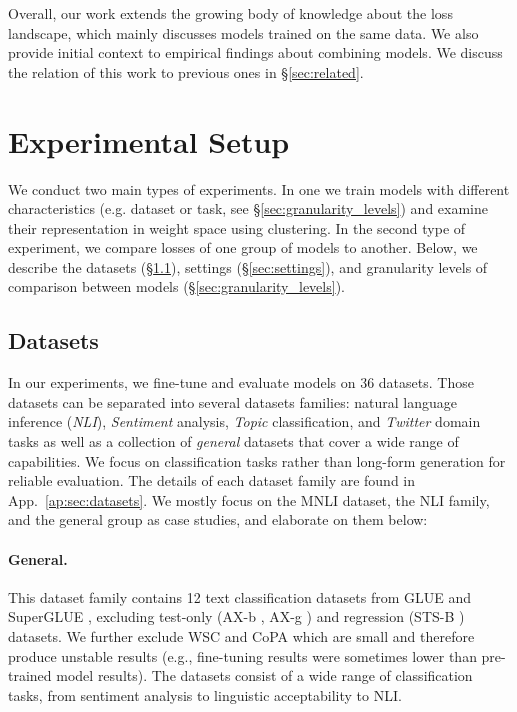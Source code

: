 \documentclass[nohyperref]{article}
\theoremstyle{plain}
\theoremstyle{definition}
\theoremstyle{remark}
\begin{document}
Overall, our work extends the growing body of knowledge about the loss landscape, which mainly discusses models trained on the same data.
We also provide initial context to empirical findings about combining models.
We discuss the relation of this work to previous ones in \S\ref{sec:related}.


\section{Experimental Setup}
We conduct two main types of experiments. In one we train models with different characteristics (e.g. dataset or task, see \S\ref{sec:granularity_levels}) and examine their representation in weight space using clustering. In the second type of experiment, we compare losses of one group of models to another.
Below, we describe the datasets (\S\ref{sec:datasets}), settings (\S\ref{sec:settings}), and granularity levels of comparison between models (\S\ref{sec:granularity_levels}).


\subsection{Datasets}\label{sec:datasets}
In our experiments, we fine-tune and evaluate models on 36 datasets. Those datasets can be separated into several datasets families: natural language inference (\emph{NLI}), \emph{Sentiment} analysis, \emph{Topic} classification, and \emph{Twitter} domain tasks as well as a collection of \emph{general} datasets that cover a wide range of capabilities. We focus on classification tasks rather than long-form generation for reliable evaluation. The details of each dataset family are found in App.~\ref{ap:sec:datasets}. We mostly focus on the MNLI \citep{williams2018broad} dataset, the NLI family, and the general group as case studies, and elaborate on them below:

\paragraph{General.} This dataset family contains 12 text classification datasets from GLUE \citep{wang-etal-2018-glue} and SuperGLUE \citep{Wang2019SuperGLUEAS}, excluding test-only (AX-b \citep{Wang2019SuperGLUEAS}, AX-g \citep{Poliak2018CollectingDN}) and regression (STS-B \citep{Cer2017SemEval2017T1}) datasets. We further exclude WSC \citep{levesque2012winograd} and CoPA \citep{roemmele2011choice} which are small and therefore produce unstable results (e.g., fine-tuning results were sometimes lower than pre-trained model results). The datasets consist of a wide range of classification tasks, from sentiment analysis to linguistic acceptability to NLI.
\end{document}
